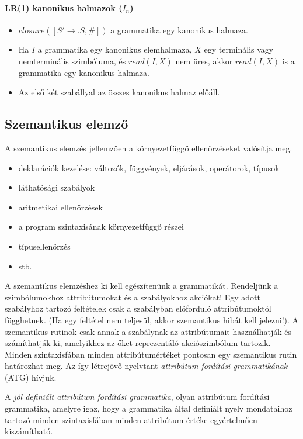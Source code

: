 \documentclass[margin=0px]{article}
\begin{document}
	
	\paragraph{LR(1) kanonikus halmazok ($ I_n $)}
	\begin{itemize}
		\item 
		$ closure([S' \rightarrow .S, \#]) $ a grammatika egy kanonikus halmaza.
		\item 
		Ha $ I $ a grammatika egy kanonikus elemhalmaza, $ X $ egy terminális vagy nemterminális szimbóluma, és $ read(I, X) $ nem üres, akkor $ read(I, X) $ is a grammatika egy kanonikus halmaza.
		\item 
		Az első két szabállyal az összes kanonikus halmaz előáll.
	\end{itemize}
		
	
	
	
\subsection{Szemantikus elemző}
	

	A szemantikus elemzés jellemzően a környezetfüggő ellenőrzéseket
	valósítja meg.
	
	\begin{itemize}
		\item 
		deklarációk kezelése: változók, függvények, eljárások, operátorok, 	típusok
		\item
		láthatósági szabályok
		\item
			aritmetikai ellenőrzések
		\item
		a program szintaxisának környezetfüggő részei
		\item 
		típusellenőrzés
		\item 
		stb. 
	\end{itemize}
	
	
	A szemantikus elemzéshez ki kell egészítenünk a grammatikát. Rendeljünk a szimbólumokhoz attribútumokat és a szabályokhoz akciókat! Egy adott szabályhoz tartozó feltételek csak a szabályban	előforduló attribútumoktól függhetnek.	(Ha egy feltétel nem teljesül, akkor szemantikus hibát kell	jelezni!). A szemantikus rutinok csak annak a szabálynak az	attribútumait használhatják és számíthatják ki, amelyikhez az őket reprezentáló akciószimbólum tartozik. Minden szintaxisfában minden attribútumértéket pontosan egy
	szemantikus rutin határozhat meg. Az így létrejövő nyelvtant \textit{attribútum fordítási grammatikának} (ATG) hívjuk.

	A \textit{jól definiált attribútum fordítási grammatika}, olyan attribútum fordítási grammatika, amelyre igaz, hogy a	grammatika által definiált nyelv mondataihoz tartozó minden szintaxisfában minden attribútum értéke egyértelműen kiszámítható.
	
\end{document}
